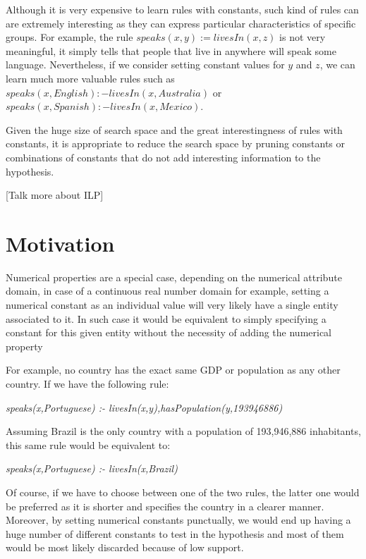 Although it is very expensive to learn rules with constants, such kind of rules can are extremely interesting as they
can express particular characteristics of specific groups. For example, the rule $speaks(x,y) := livesIn(x,z)$ is not
very meaningful, it simply tells that people that live in anywhere will speak some language. Nevertheless, if we
consider setting constant values for $y$ and $z$, we can learn much more valuable rules such as $speaks(x,English) :-
livesIn(x,Australia)$ or $speaks(x,Spanish) :- livesIn(x,Mexico)$.

Given the huge size of search space and the great interestingness of rules with constants, it is appropriate to reduce
the search space by pruning constants or combinations of constants that do not add interesting information to the
hypothesis.

[Talk more about ILP]


\section{Motivation}

Numerical properties are a special case, depending on the numerical attribute
domain, in case of a continuous real number domain for example, setting a numerical constant as an individual value will
very likely have a single entity associated to it. In such case it would be equivalent to simply specifying a constant
for this given entity without the necessity of adding the numerical property

For example, no country has the exact same GDP or population as any other country. If we have the following rule:

\begin{center}
 \emph{speaks(x,Portuguese) :- livesIn(x,y),hasPopulation(y,193946886)}
\end{center}

Assuming Brazil is the only country with a population of 193,946,886 inhabitants, this same rule would be equivalent to:

\begin{center}
 \emph{speaks(x,Portuguese) :- livesIn(x,Brazil)}
\end{center}

Of course, if we have to choose between one of the two rules, the latter one would be preferred as it is shorter and
specifies the country in a clearer manner. Moreover, by setting numerical constants punctually, we would end up having a
huge number of different constants to test in the hypothesis and most of them would be most likely discarded because of
low support.


